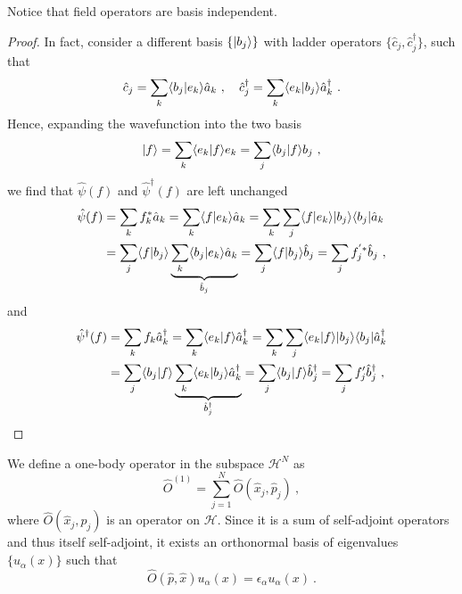     Notice that field operators are basis independent.
    \begin{proof}
        In fact, consider a different basis $\{\vert b_j\rangle\}$ with ladder operators $\{ \hat c_j, \hat c_j^\dagger\}$, such that 
        \begin{equation*}
            \hat c_j = \sum_k \langle b_j\vert e_k\rangle \hat a_k ~, \quad \hat c_j^\dagger = \sum_k \langle e_k\vert b_j\rangle \hat a_k^\dagger ~.
        \end{equation*}
        Hence, expanding the wavefunction into the two basis 
        \begin{equation*}
            \vert f\rangle = \sum_k \langle e_k\vert f\rangle e_k = \sum_j \langle b_j\vert f\rangle b_j ~,
        \end{equation*}
        we find that $\hat \psi(f)$ and $\hat \psi^\dagger (f)$ are left unchanged 
        \begin{equation*}
        \begin{aligned}
            \hat \psi(f) & = \sum_k f_k^* \hat a_k = \sum_k \langle f\vert e_k\rangle \hat a_k = \sum_k \sum_j \langle f\vert e_k\rangle \vert b_j\rangle \langle b_j\vert \hat a_k \\ & = \sum_j \langle f\vert b_j\rangle \underbrace{\sum_k \langle b_j\vert e_k\rangle \hat a_k}_{\hat b_j} = \sum_j \langle f\vert b_j\rangle \hat b_j = \sum_j f^{'*}_j  \hat b_j  ~,
        \end{aligned}
        \end{equation*}
        and 
        \begin{equation*}
        \begin{aligned}
            \hat \psi^\dagger (f) & = \sum_k f_k \hat a_k^\dagger = \sum_k \langle e_k\vert f\rangle \hat a_k^\dagger = \sum_k \sum_j \langle e_k\vert f\rangle \vert b_j\rangle \langle b_j\vert \hat a_k^\dagger \\ & = \sum_j \langle b_j\vert f\rangle \underbrace{\sum_k \langle e_k\vert b_j\rangle \hat a_k^\dagger}_{\hat b_j^\dagger} = \sum_j \langle b_j\vert f\rangle \hat b_j^\dagger = \sum_j f'_j  \hat b_j^\dagger  ~,
        \end{aligned}
        \end{equation*}
    \end{proof}

    We define a one-body operator in the subspace $\mathcal H^{N}$ as 
    \begin{equation*}
        \hat O^{(1)} = \sum_{j=1}^{N} \hat O(\hat x_j, \hat p_j) ~,
    \end{equation*}
    where $\hat O(\hat x_j, \hat p_j)$ is an operator on $\mathcal H$. Since it is a sum of self-adjoint operators and thus itself self-adjoint, it exists an orthonormal basis of eigenvalues $\{u_\alpha (x)\}$ such that 
    \begin{equation}\label{evop}
        \hat O(\hat p, \hat x) u_\alpha (x) = \epsilon_\alpha u_\alpha (x) ~.
    \end{equation}

